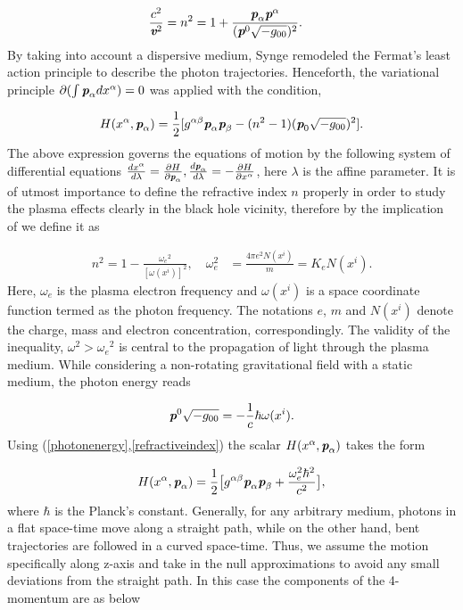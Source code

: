 \documentclass[final,5p,times,twocolumn,unknownkeysallowed]{elsarticle}
\begin{document}
\begin{align}\label{phasevp}
\frac{c^2}{\textit{\textbf{v}}^2}&=n^2=1+\frac{\textit{\textbf{p}}_\alpha \textit{\textbf{p}}^\alpha}{(\textit{\textbf{p}}^0\sqrt{-g_{00}})^2}.
\end{align}
By taking into account a dispersive medium, Synge \cite{Synge:1960b} remodeled
the Fermat’s least action principle to describe the photon trajectories. Henceforth, the variational principle $\partial(\int \textit{\textbf{p}}_\alpha dx^\alpha)=0$ was applied with the condition,

\begin{align}\label{Hamilton}
H(x^\alpha,\textit{\textbf{p}}_\alpha)=\frac{1}{2}[g^{\alpha\beta}\textit{\textbf{p}}_\alpha \textit{\textbf{p}}_\beta-(n^2-1)(\textit{\textbf{p}}_0
\sqrt{-g_{00}})^2].
\end{align}
The above expression governs the equations of motion by the following system of differential equations
$\frac{dx^\alpha}{d\lambda}=\frac{\partial H}{\partial \textit{\textbf{p}}_\alpha},
\frac{d\textit{\textbf{p}}_\alpha}{d\lambda}=-\frac{\partial H}{\partial x^\alpha}$, here $\lambda$ is the affine parameter.
 It is of utmost importance to define the refractive index $n$ properly in order to study the plasma effects
clearly in the black hole  vicinity, therefore by the implication of \cite{Bin:2010a} we define it as

\begin{align}\label{refractiveindex}
n^2=1-\frac{{\omega_{e}}^2}{[\omega(x^i)]^2}, \quad  \omega_{e}^2&=\frac{4\pi e^2 N(x^i)}{m}=K_{e}N(x^i).
\end{align}
Here, $\omega_e$ is the plasma electron frequency and $\omega(x^i)$ is a space coordinate function termed as the photon frequency.
The notations $e$, $m$ and $N(x^i)$ denote the charge, mass and electron concentration, correspondingly. The validity of the inequality, $\omega^2>{\omega_{e}}^2$ is central to the propagation of light through the plasma medium.
While considering a non-rotating gravitational field with a static medium, the photon energy reads  \cite{Synge:1960b}

\begin{align}\label{photonenergy}
\textit{\textbf{p}}^0\sqrt{-g_{00}}=-\frac{1}{c}\hbar \omega(x^i).
\end{align}
Using (\ref{photonenergy},\ref{refractiveindex}) the scalar $H(x^\alpha,\textit{\textbf{p}}_\alpha)$ takes the form

\begin{align}\label{Hamiltoneq3}
H(x^\alpha,\textit{\textbf{p}}_\alpha)=\frac{1}{2}\big[g^{\alpha\beta}\textit{\textbf{p}}_\alpha \textit{\textbf{p}}_\beta+\frac{\omega^2_e \hbar^2}{c^2}\big],
\end{align}
where $\hbar$ is the Planck’s constant. Generally, for any arbitrary medium, photons in a flat space-time move along a straight path, while on the
other hand, bent trajectories are followed in a curved space-time. Thus, we assume the motion specifically
along z-axis and take in the null approximations \cite{Bin:2010a} to avoid any small deviations from the straight path.
In this case the components of the 4-momentum are as below
\end{document}
